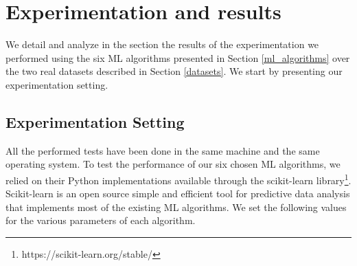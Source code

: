 \section{Experimentation and results}\label{experimentations}
We detail and analyze in the section the results of the experimentation we performed using the six ML algorithms presented in Section \ref{ml_algorithms} over the two real datasets described in Section \ref{datasets}. We start by presenting our experimentation setting.

\subsection{Experimentation Setting}
All the performed tests have been done in the same machine and the same operating system. To test the performance of our six chosen ML algorithms, 
we relied on their Python implementations available through the scikit-learn library\footnote{https://scikit-learn.org/stable/}. Scikit-learn is an open source simple and efficient tool for predictive data analysis that implements
most of the existing ML algorithms. We set the following  values for the various parameters of each algorithm.
